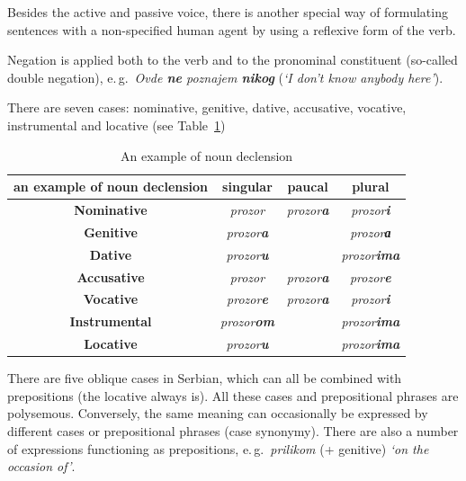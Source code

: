 \begin{multicols}{2}
Besides the active and passive voice, there is another special way of formulating sentences with a non-specified human agent by using a reflexive form of the verb. 

Negation is applied both to the verb and to the pronominal constituent (so-called double negation), e.\,g.~\textit{Ovde \textbf{ne} poznajem \textbf{nikog}} (\textit{‘I don’t know anybody here’}).

There are seven cases: nominative, genitive, dative, accusative, vocative, instrumental and locative (see Table~\ref{declension}) 

\begin{table}[ht]
\begin{center}
\begin{tabular}{|c|c|c|c|}
\hline
{\textbf{an example of noun declension}} & {\textbf{singular}} & {\textbf{paucal}} & {\textbf{plural}} \\
\hline
{\textbf{Nominative}} & \textit{prozor} & \textit{prozor\textbf{a}} & \textit{prozor\textbf{i}} \\
\hline
{\textbf{Genitive}} & \textit{prozor\textbf{a}} & & \textit{prozor\textbf{а}} \\
\hline
{\textbf{Dative}} & \textit{prozor\textbf{u}} & & \textit{prozor\textbf{ima}} \\
\hline
{\textbf{Accusative}} & \textit{prozor} & \textit{prozor\textbf{a}} & \textit{prozor\textbf{e}} \\
\hline
{\textbf{Vocative}} & \textit{prozor\textbf{e}} & \textit{prozor\textbf{a}} & \textit{prozor\textbf{i}} \\
\hline
{\textbf{Instrumental}} & \textit{prozor\textbf{om}} & & \textit{prozor\textbf{ima}} \\
\hline
{\textbf{Locative}} & \textit{prozor\textbf{u}} & & \textit{prozor\textbf{ima}} \\
\hline
\end{tabular}
\end{center}
\caption{An example of noun declension}
\label{declension} 
\end{table}

There are five oblique cases in Serbian, which can all be combined with prepositions (the locative always is). All these cases and prepositional phrases are polysemous. Conversely, the same meaning can occasionally be expressed by different cases or prepositional phrases (case synonymy). There are also a number of expressions functioning as prepositions, e.\,g.~\textit{prilikom} (+ genitive) \textit{‘on the occasion of’}.


\end{multicols}
